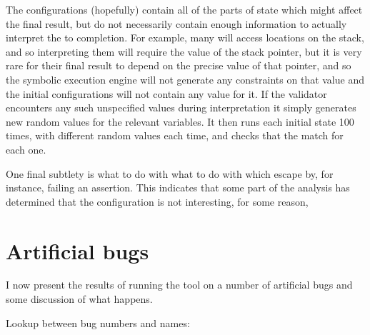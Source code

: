 The configurations (hopefully) contain all of the parts of
\StateMachine state which might affect the final result, but do not
necessarily contain enough information to actually interpret the
\StateMachines to completion.  For example, many \StateMachines will
access locations on the stack, and so interpreting them will require
the value of the stack pointer, but it is very rare for their final
result to depend on the precise value of that pointer, and so the
symbolic execution engine will not generate any constraints on that
value and the initial configurations will not contain any value for
it.  If the validator encounters any such unspecified values during
\StateMachine interpretation it simply generates new random values for
the relevant variables.  It then runs each initial state 100 times,
with different random values each time, and checks that the
\StateMachines match for each one.

One final subtlety is what to do with what to do with \StateMachines
which escape by, for instance, failing an assertion.  This indicates
that some part of the analysis has determined that the configuration
is not interesting, for some reason, 


\section{Artificial bugs}

I now present the results of running the tool on a number of
artificial bugs and some discussion of what happens.

Lookup between bug numbers and names:

